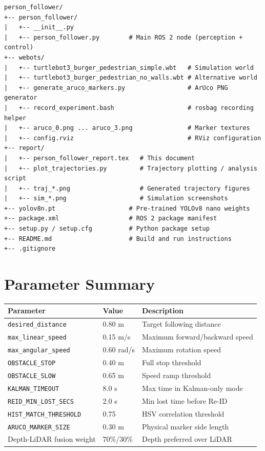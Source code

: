 \documentclass[12pt,a4paper]{article}
\begin{document}
{\small
\begin{verbatim}
person_follower/
+-- person_follower/
|   +-- __init__.py
|   +-- person_follower.py        # Main ROS 2 node (perception + control)
+-- webots/
|   +-- turtlebot3_burger_pedestrian_simple.wbt   # Simulation world
|   +-- turtlebot3_burger_pedestrian_no_walls.wbt # Alternative world
|   +-- generate_aruco_markers.py                 # ArUco PNG generator
|   +-- record_experiment.bash                    # rosbag recording helper
|   +-- aruco_0.png ... aruco_3.png               # Marker textures
|   +-- config.rviz                               # RViz configuration
+-- report/
|   +-- person_follower_report.tex   # This document
|   +-- plot_trajectories.py         # Trajectory plotting / analysis script
|   +-- traj_*.png                   # Generated trajectory figures
|   +-- sim_*.png                    # Simulation screenshots
+-- yolov8n.pt                    # Pre-trained YOLOv8 nano weights
+-- package.xml                   # ROS 2 package manifest
+-- setup.py / setup.cfg          # Python package setup
+-- README.md                     # Build and run instructions
+-- .gitignore
\end{verbatim}
}

\section{Parameter Summary}

\begin{center}
\begin{tabular}{lll}
\toprule
\textbf{Parameter} & \textbf{Value} & \textbf{Description} \\
\midrule
\texttt{desired\_distance}       & 0.80 m   & Target following distance \\
\texttt{max\_linear\_speed}      & 0.15 m/s & Maximum forward/backward speed \\
\texttt{max\_angular\_speed}     & 0.60 rad/s & Maximum rotation speed \\
\texttt{OBSTACLE\_STOP}          & 0.40 m   & Full stop threshold \\
\texttt{OBSTACLE\_SLOW}          & 0.65 m   & Speed ramp threshold \\
\texttt{KALMAN\_TIMEOUT}         & 8.0 s    & Max time in Kalman-only mode \\
\texttt{REID\_MIN\_LOST\_SECS}   & 2.0 s    & Min lost time before Re-ID \\
\texttt{HIST\_MATCH\_THRESHOLD}  & 0.75     & HSV correlation threshold \\
\texttt{ARUCO\_MARKER\_SIZE}     & 0.30 m   & Physical marker side length \\
Depth-LiDAR fusion weight        & 70\%/30\%& Depth preferred over LiDAR \\
\bottomrule
\end{tabular}
\end{center}
\end{document}
